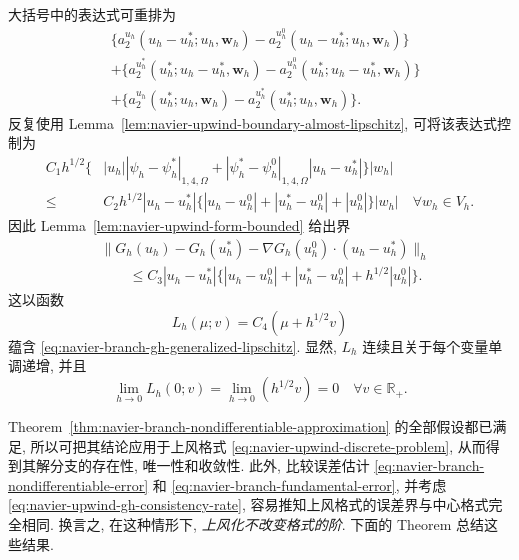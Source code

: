 大括号中的表达式可重排为
\[
\begin{aligned}
&\{a_2^{u_h}(u_h-u_h^*;u_h,\boldsymbol w_h)
-a_2^{u_h^0}(u_h-u_h^*;u_h,\boldsymbol w_h)\}\\
&+\{a_2^{u_h^*}(u_h^*;u_h-u_h^*,\boldsymbol w_h)
-a_2^{u_h^0}(u_h^*;u_h-u_h^*,\boldsymbol w_h)\}\\
&+\{a_2^{u_h}(u_h^*;u_h,\boldsymbol w_h)
-a_2^{u_h^*}(u_h^*;u_h,\boldsymbol w_h)\}.
\end{aligned}
\]
反复使用 Lemma~\ref{lem:navier-upwind-boundary-almost-lipschitz}, 可将该表达式控制为
\[
\begin{aligned}
C_1h^{1/2}\{&|u_h||\psi_h-\psi_h^*|_{1,4,\Omega}
+|\psi_h^*-\psi_h^0|_{1,4,\Omega}|u_h-u_h^*|\}|w_h|\\
\leq{}&C_2h^{1/2}|u_h-u_h^*|
\{|u_h-u_h^0|+|u_h^*-u_h^0|+|u_h^0|\}|w_h|
\quad\forall w_h\in V_h.
\end{aligned}
\]
因此 Lemma~\ref{lem:navier-upwind-form-bounded} 给出界
\[
\begin{aligned}
&\|G_h(u_h)-G_h(u_h^*)
-\nabla G_h(u_h^0)\cdot(u_h-u_h^*)\|_h\\
&\qquad\leq C_3|u_h-u_h^*|
\{|u_h-u_h^0|+|u_h^*-u_h^0|+h^{1/2}|u_h^0|\}.
\end{aligned}
\]
这以函数
\[
L_h(\mu;v)=C_4(\mu+h^{1/2}v)
\]
蕴含 \eqref{eq:navier-branch-gh-generalized-lipschitz}.
显然, $L_h$ 连续且关于每个变量单调递增, 并且
\[
\lim_{h\to0}L_h(0;v)=\lim_{h\to0}(h^{1/2}v)=0
\quad\forall v\in\mathbb R_+.
\]

Theorem~\ref{thm:navier-branch-nondifferentiable-approximation} 的全部假设都已满足,
所以可把其结论应用于上风格式 \eqref{eq:navier-upwind-discrete-problem},
从而得到其解分支的存在性, 唯一性和收敛性. 此外, 比较误差估计
\eqref{eq:navier-branch-nondifferentiable-error} 和
\eqref{eq:navier-branch-fundamental-error}, 并考虑
\eqref{eq:navier-upwind-gh-consistency-rate}, 容易推知上风格式的误差界与中心格式完全相同.
换言之, 在这种情形下, \textit{上风化不改变格式的阶}. 下面的 Theorem 总结这些结果.

